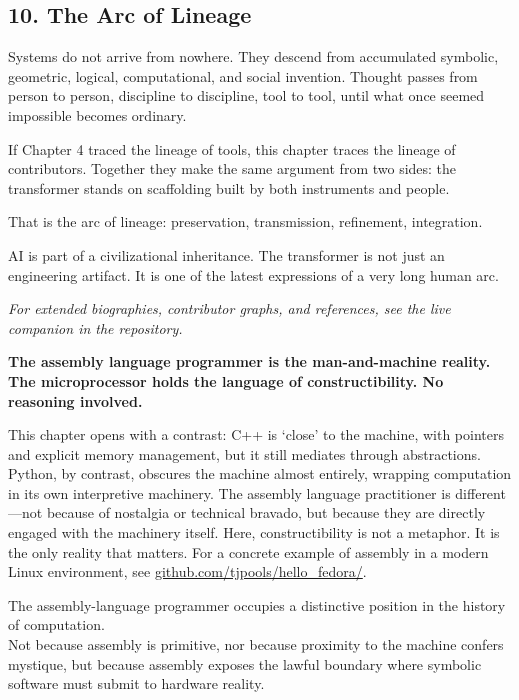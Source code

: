 \hypertarget{the-arc-of-lineage}{%
\subsection{10. The Arc of Lineage}\label{the-arc-of-lineage}}

Systems do not arrive from nowhere. They descend from accumulated
symbolic, geometric, logical, computational, and social invention.
Thought passes from person to person, discipline to discipline, tool to
tool, until what once seemed impossible becomes ordinary.

If Chapter 4 traced the lineage of tools, this chapter traces the
lineage of contributors. Together they make the same argument from two
sides: the transformer stands on scaffolding built by both instruments
and people.

That is the arc of lineage: preservation, transmission, refinement,
integration.

AI is part of a civilizational inheritance. The transformer is not just
an engineering artifact. It is one of the latest expressions of a very
long human arc.

\emph{For extended biographies, contributor graphs, and references, see
the live companion in the repository.}

\textbf{The assembly language programmer is the man-and-machine reality.
The microprocessor holds the language of constructibility. No reasoning
involved.}

This chapter opens with a contrast: C++ is `close' to the machine, with
pointers and explicit memory management, but it still mediates through
abstractions. Python, by contrast, obscures the machine almost entirely,
wrapping computation in its own interpretive machinery. The assembly
language practitioner is different---not because of nostalgia or
technical bravado, but because they are directly engaged with the
machinery itself. Here, constructibility is not a metaphor. It is the
only reality that matters. For a concrete example of assembly in a
modern Linux environment, see
\href{https://github.com/tjpools/hello_fedora/}{github.com/tjpools/hello\_fedora/}.

The assembly-language programmer occupies a distinctive position in the
history of computation.\\
Not because assembly is primitive, nor because proximity to the machine
confers mystique, but because assembly exposes the lawful boundary where
symbolic software must submit to hardware reality.


